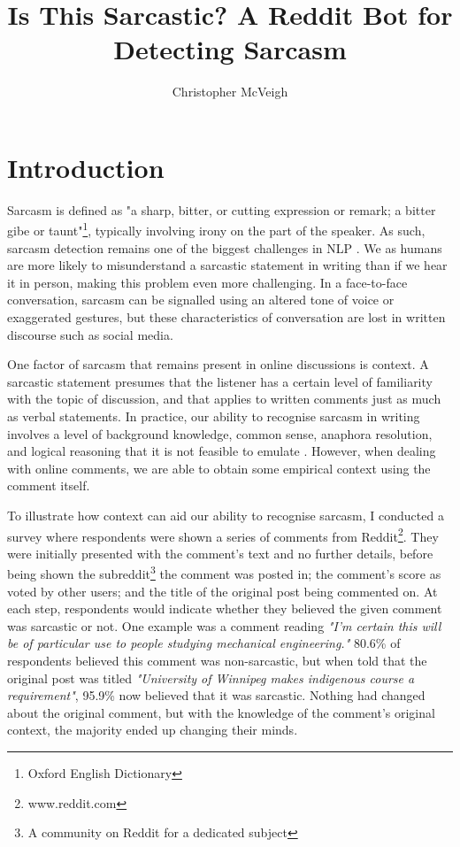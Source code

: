 \documentclass[a4paper,12pt]{article}
\title{Is This Sarcastic? A Reddit Bot for Detecting Sarcasm}
\author{Christopher McVeigh}
\begin{document}

\linespread{1.3}

\thispagestyle{empty}
\setcounter{tocdepth}{2}
\tableofcontents
\thispagestyle{empty}
\clearpage
\setcounter{page}{1}


\section{Introduction}
Sarcasm is defined as "a sharp, bitter, or cutting expression or remark; a bitter gibe or taunt"\footnote{Oxford English Dictionary}, typically involving irony on the part of the speaker. As such, sarcasm detection remains one of the biggest challenges in NLP \cite{cambriaSentimentAnalysisBig2017}. We as humans are more likely to misunderstand a sarcastic statement in writing than if we hear it in person, making this problem even more challenging. In a face-to-face conversation, sarcasm can be signalled using an altered tone of voice or exaggerated gestures, but these characteristics of conversation are lost in written discourse such as social media.

One factor of sarcasm that remains present in online discussions is context. A sarcastic statement presumes that the listener has a certain level of familiarity with the topic of discussion, and that applies to written comments just as much as verbal statements. In practice, our ability to recognise sarcasm in writing involves a level of background knowledge, common sense, anaphora resolution, and logical reasoning that it is not feasible to emulate \cite{poriaDeeperLookSarcastic2017}. However, when dealing with online comments, we are able to obtain some empirical context using the comment itself.

To illustrate how context can aid our ability to recognise sarcasm, I conducted a survey where respondents were shown a series of comments from Reddit\footnote{www.reddit.com}. They were initially presented with the comment's text and no further details, before being shown the subreddit\footnote{A community on Reddit for a dedicated subject} the comment was posted in; the comment's score as voted by other users; and the title of the original post being commented on. At each step, respondents would indicate whether they believed the given comment was sarcastic or not. One example was a comment reading \textit{"I'm certain this will be of particular use to people studying mechanical engineering."} 80.6\% of respondents believed this comment was non-sarcastic, but when told that the original post was titled \textit{"University of Winnipeg makes indigenous course a requirement"}, 95.9\% now believed that it was sarcastic. Nothing had changed about the original comment, but with the knowledge of the comment's original context, the majority ended up changing their minds.
\end{document}
